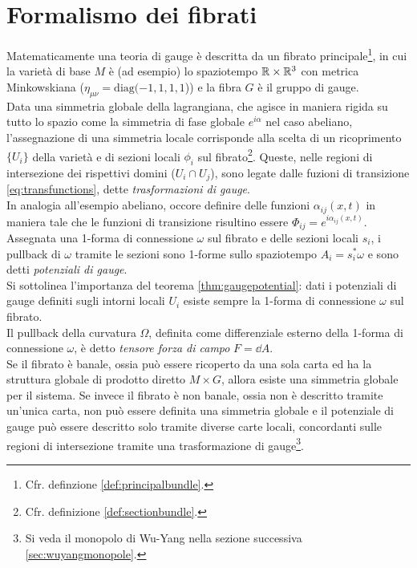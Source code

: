 \section{Formalismo dei fibrati}
Matematicamente una teoria di gauge è descritta da un fibrato principale\footnote{
   Cfr. definzione \ref{def:principalbundle}.
}, in cui
la varietà di base $M$ è (ad esempio) lo spaziotempo $\mathbb{R}\times\mathbb{R}^3$ con metrica
Minkowskiana ($ \eta _{\mu\nu} = \mathrm{diag}(-1,1,1,1$)) e la fibra $G$ è il
gruppo di gauge.\\
Data una simmetria globale della lagrangiana, che agisce in maniera rigida su
tutto lo spazio
come la simmetria di fase globale $e^{i\alpha}$ nel caso abeliano,
l'assegnazione di una simmetria locale
corrisponde alla scelta di un ricoprimento $\{U_i\}$ della varietà
e di sezioni locali $\phi_i$ sul fibrato\footnote{
  Cfr. definizione \ref{def:sectionbundle}.
}. Queste, nelle regioni di intersezione dei rispettivi domini ($U_i \cap U_j$),
sono legate dalle fuzioni di transizione \ref{eq:transfunctions},
dette \emph{trasformazioni di gauge}.\\
In analogia all'esempio abeliano, occore definire delle
funzioni $\alpha_{ij}(x,t)$ in maniera tale che le funzioni di transizione risultino
essere $\Phi_{ij} = e^{i\alpha_{ij}(x,t)}$.\\

Assegnata una 1-forma di connessione $\omega$ sul fibrato e delle sezioni locali
$s_i$, i pullback di $\omega$ tramite le sezioni sono 1-forme sullo spaziotempo
$A_i = s_i^* \omega$ e sono detti \emph{potenziali di gauge}.\\
Si sottolinea l'importanza del teorema \ref{thm:gaugepotential}: dati i
potenziali di gauge definiti sugli intorni locali $U_i$ esiste sempre la 1-forma
di connessione $\omega$ sul fibrato.\\

Il pullback della curvatura $\Omega$, definita come differenziale esterno della
1-forma di connessione $\omega$, è detto \emph{tensore forza di campo} $F = \dd A$.\\

Se il fibrato è banale, ossia può essere ricoperto da una sola carta ed ha la
struttura globale di prodotto diretto $M \times G$, allora esiste una simmetria
globale per il sistema. Se invece il fibrato è non banale, ossia non è descritto
tramite un'unica carta, non può essere definita una simmetria globale e il potenziale
di gauge può essere descritto solo tramite diverse carte locali, concordanti sulle
regioni di intersezione tramite una trasformazione di gauge\footnote{
  Si veda il monopolo di Wu-Yang nella sezione successiva \ref{sec:wuyangmonopole}.
}.\\
